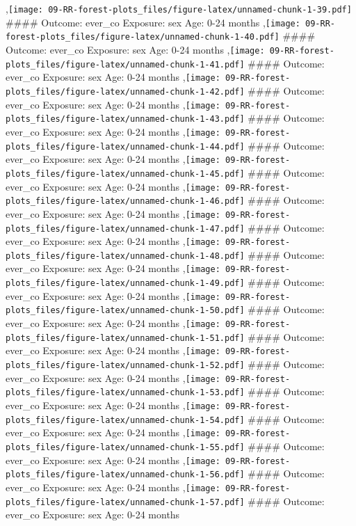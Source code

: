 \documentclass[
  9pt,
]{book}
\begin{document}
,\texttt{[image: 09-RR-forest-plots\_files/figure-latex/unnamed-chunk-1-39.pdf]}
\#\#\#\# Outcome: ever\_co Exposure: sex Age: 0-24 months
,\texttt{[image: 09-RR-forest-plots\_files/figure-latex/unnamed-chunk-1-40.pdf]}
\#\#\#\# Outcome: ever\_co Exposure: sex Age: 0-24 months
,\texttt{[image: 09-RR-forest-plots\_files/figure-latex/unnamed-chunk-1-41.pdf]}
\#\#\#\# Outcome: ever\_co Exposure: sex Age: 0-24 months
,\texttt{[image: 09-RR-forest-plots\_files/figure-latex/unnamed-chunk-1-42.pdf]}
\#\#\#\# Outcome: ever\_co Exposure: sex Age: 0-24 months
,\texttt{[image: 09-RR-forest-plots\_files/figure-latex/unnamed-chunk-1-43.pdf]}
\#\#\#\# Outcome: ever\_co Exposure: sex Age: 0-24 months
,\texttt{[image: 09-RR-forest-plots\_files/figure-latex/unnamed-chunk-1-44.pdf]}
\#\#\#\# Outcome: ever\_co Exposure: sex Age: 0-24 months
,\texttt{[image: 09-RR-forest-plots\_files/figure-latex/unnamed-chunk-1-45.pdf]}
\#\#\#\# Outcome: ever\_co Exposure: sex Age: 0-24 months
,\texttt{[image: 09-RR-forest-plots\_files/figure-latex/unnamed-chunk-1-46.pdf]}
\#\#\#\# Outcome: ever\_co Exposure: sex Age: 0-24 months
,\texttt{[image: 09-RR-forest-plots\_files/figure-latex/unnamed-chunk-1-47.pdf]}
\#\#\#\# Outcome: ever\_co Exposure: sex Age: 0-24 months
,\texttt{[image: 09-RR-forest-plots\_files/figure-latex/unnamed-chunk-1-48.pdf]}
\#\#\#\# Outcome: ever\_co Exposure: sex Age: 0-24 months
,\texttt{[image: 09-RR-forest-plots\_files/figure-latex/unnamed-chunk-1-49.pdf]}
\#\#\#\# Outcome: ever\_co Exposure: sex Age: 0-24 months
,\texttt{[image: 09-RR-forest-plots\_files/figure-latex/unnamed-chunk-1-50.pdf]}
\#\#\#\# Outcome: ever\_co Exposure: sex Age: 0-24 months
,\texttt{[image: 09-RR-forest-plots\_files/figure-latex/unnamed-chunk-1-51.pdf]}
\#\#\#\# Outcome: ever\_co Exposure: sex Age: 0-24 months
,\texttt{[image: 09-RR-forest-plots\_files/figure-latex/unnamed-chunk-1-52.pdf]}
\#\#\#\# Outcome: ever\_co Exposure: sex Age: 0-24 months
,\texttt{[image: 09-RR-forest-plots\_files/figure-latex/unnamed-chunk-1-53.pdf]}
\#\#\#\# Outcome: ever\_co Exposure: sex Age: 0-24 months
,\texttt{[image: 09-RR-forest-plots\_files/figure-latex/unnamed-chunk-1-54.pdf]}
\#\#\#\# Outcome: ever\_co Exposure: sex Age: 0-24 months
,\texttt{[image: 09-RR-forest-plots\_files/figure-latex/unnamed-chunk-1-55.pdf]}
\#\#\#\# Outcome: ever\_co Exposure: sex Age: 0-24 months
,\texttt{[image: 09-RR-forest-plots\_files/figure-latex/unnamed-chunk-1-56.pdf]}
\#\#\#\# Outcome: ever\_co Exposure: sex Age: 0-24 months
,\texttt{[image: 09-RR-forest-plots\_files/figure-latex/unnamed-chunk-1-57.pdf]}
\#\#\#\# Outcome: ever\_co Exposure: sex Age: 0-24 months
\end{document}
